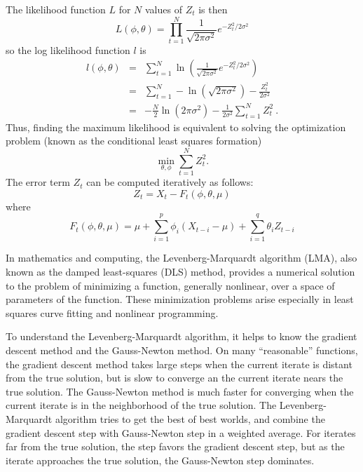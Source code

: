 \documentclass[english,12pt]{article}
\begin{document}
The likelihood function $L$ for $N$ values of $Z_t$  is then
\begin{equation}
L(\phi, \theta) = \prod_{t = 1}^N  \frac{1}{\sqrt{2 \pi \sigma^2}} e^{-Z^2_t/2 \sigma^2}
\end{equation}
so the log likelihood function $l$ is
\begin{eqnarray}
l(\phi, \theta) &=& \sum_{t = 1}^N \ln \left(\frac{1}{\sqrt{2 \pi \sigma^2}}
 e^{-Z^2_t/2 \sigma^2}
 \right) \nonumber\\
 &=&  \sum_{t = 1}^N  - \ln \left( \sqrt{2 \pi \sigma^2}\right)
-\frac{Z^2_t}{2 \sigma^2}\nonumber\\
&=&  -\frac{N}{2} \ln \left( 2 \pi \sigma^2\right)  - \frac{1}{2
  \sigma^2} \sum_{t = 1}^N   Z^2_t\ . \label{eq:loglikelihood}
\end{eqnarray}
Thus, finding the maximum likelihood is equivalent to solving the
optimization problem (known as the conditional least squares
formation)
\begin{equation}
\min_{\theta, \phi} \sum_{t = 1}^N  Z^2_t.
\end{equation}
The error term $Z_t$ can be computed iteratively as follows:
\begin{equation}
    Z_t = X_t - F_t(\phi, \theta, \mu) \label{eq:error-terms}
\end{equation}
where
\begin{equation}
F_t(\phi, \theta, \mu) = \mu + \sum_{i=1}^p \phi_i (X_{t-i}-\mu) + \sum_{i=1}^q
\theta_i Z_{t-i}
\end{equation}

In mathematics and computing, the Levenberg-Marquardt algorithm (LMA),
also known as the damped least-squares (DLS) method, provides a
numerical solution to the problem of minimizing a function, generally
nonlinear, over a space of parameters of the function. These
minimization problems arise especially in least squares curve fitting
and nonlinear programming.

To understand the Levenberg-Marquardt algorithm, it helps to know the
gradient descent method and the Gauss-Newton method.  On many
``reasonable'' functions, the gradient descent method takes large
steps when the current iterate is distant from the true solution, but
is slow to converge an the current iterate nears the true solution.
The Gauss-Newton method is much faster for converging when the current
iterate is in the neighborhood of the true solution.  The
Levenberg-Marquardt algorithm tries to get the best of best worlds,
and combine the gradient descent step with Gauss-Newton step in a
weighted average.  For iterates far from the true solution, the step
favors the gradient descent step, but as the iterate approaches the
true solution, the Gauss-Newton step dominates.
\end{document}
